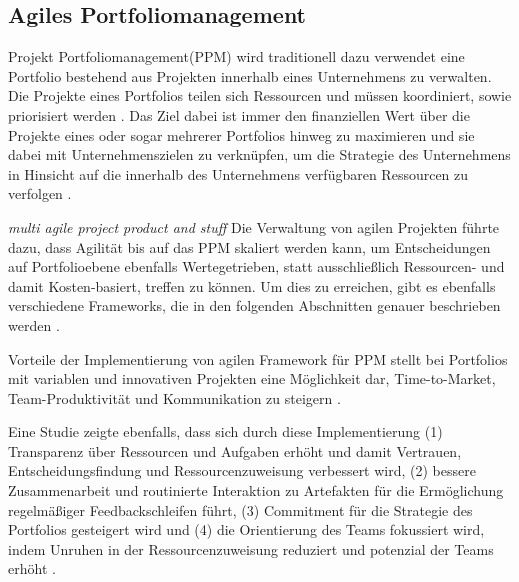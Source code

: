 \subsection{Agiles Portfoliomanagement}
Projekt Portfoliomanagement(PPM) wird traditionell dazu verwendet eine Portfolio bestehend aus Projekten innerhalb eines Unternehmens zu verwalten. Die Projekte eines Portfolios teilen sich Ressourcen und müssen koordiniert, sowie priorisiert werden \cite{}.
Das Ziel dabei ist immer den finanziellen Wert über die Projekte eines oder sogar mehrerer Portfolios hinweg zu maximieren und sie dabei mit Unternehmenszielen zu verknüpfen, um die Strategie des Unternehmens in Hinsicht auf die innerhalb des Unternehmens verfügbaren Ressourcen zu verfolgen \cite{}.

\emph{multi agile project product and stuff}
Die Verwaltung von agilen Projekten führte dazu, dass Agilität bis auf das PPM skaliert werden kann, um Entscheidungen auf Portfolioebene ebenfalls Wertegetrieben, statt ausschließlich Ressourcen- und damit Kosten-basiert, treffen zu können. Um dies zu erreichen, gibt es ebenfalls verschiedene Frameworks, die in den folgenden Abschnitten genauer beschrieben werden \cite{}.

Vorteile der Implementierung von agilen Framework für PPM stellt bei Portfolios mit variablen und innovativen Projekten eine Möglichkeit dar, Time-to-Market, Team-Produktivität und Kommunikation zu steigern \cite{}.

Eine Studie zeigte ebenfalls, dass sich durch diese Implementierung (1) Transparenz über Ressourcen und Aufgaben erhöht und damit Vertrauen, Entscheidungsfindung und Ressourcenzuweisung verbessert wird, (2) bessere Zusammenarbeit und routinierte Interaktion zu Artefakten für die Ermöglichung regelmäßiger Feedbackschleifen führt, (3) Commitment für die Strategie des Portfolios gesteigert wird und (4) die Orientierung des Teams fokussiert wird, indem Unruhen in der Ressourcenzuweisung reduziert und potenzial der Teams erhöht \cite{anEmpiricalPerspectiveOnThePractiveInUse}.

